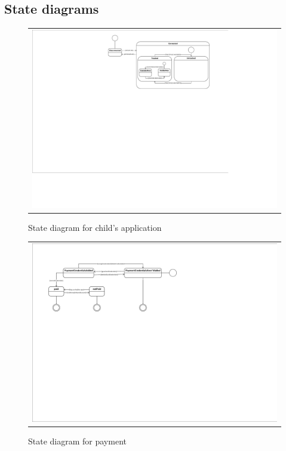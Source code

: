 \documentclass{sprawozdanie-agh}
\begin{document}
		\subsection{State diagrams}
		
		\begin{figure}[H]
			\centering
			\begin{tabular}{c}
				\includegraphics[width=.95\textwidth]{Stanu_cropped} 
			\end{tabular}
			\caption{State diagram for child's application}
		\end{figure}
 
		\begin{figure}[H]
			\centering 
			\begin{tabular}{c}
				\includegraphics[width=.95\textwidth]{paymentStateDiagram} 
			\end{tabular}
			\caption{State diagram for payment}
		\end{figure}
 
\end{document}
